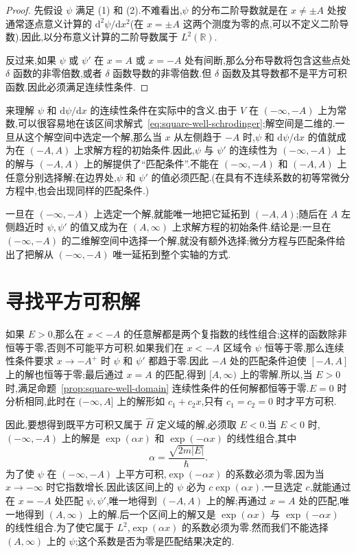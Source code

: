 \begin{proof}
先假设 \(\psi\) 满足 (1) 和 (2).不难看出,\(\psi\) 的分布二阶导数就是在 \(x\ne\pm A\) 处按通常逐点意义计算的 \(\mathrm{d}^{2}\psi/\mathrm{d}x^{2}\)(在 \(x=\pm A\) 这两个测度为零的点,可以不定义二阶导数).因此,以分布意义计算的二阶导数属于 \(L^{2}(\mathbb{R})\).

反过来,如果 \(\psi\) 或 \(\psi'\) 在 \(x=A\) 或 \(x=-A\) 处有间断,那么分布导数将包含这些点处 \(\delta\) 函数的非零倍数,或者 \(\delta\) 函数导数的非零倍数.但 \(\delta\) 函数及其导数都不是平方可积函数.因此必须满足连续性条件.
\end{proof}

来理解 \(\psi\) 和 \(\mathrm{d}\psi/\mathrm{d}x\) 的连续性条件在实际中的含义.由于 \(V\) 在 \((-\infty,-A)\) 上为常数,可以很容易地在该区间求解式~\eqref{eq:square-well-schrodinger};解空间是二维的.一旦从这个解空间中选定一个解,那么当 \(x\) 从左侧趋于 \(-A\) 时,\(\psi\) 和 \(\mathrm{d}\psi/\mathrm{d}x\) 的值就成为在 \((-A,A)\) 上求解方程的初始条件.因此,\(\psi\) 与 \(\psi'\) 的连续性为 \((-\infty,-A)\) 上的解与 \((-A,A)\) 上的解提供了“匹配条件”.不能在 \((-\infty,-A)\) 和 \((-A,A)\) 上任意分别选择解;在边界处,\(\psi\) 和 \(\psi'\) 的值必须匹配.(在具有不连续系数的初等常微分方程中,也会出现同样的匹配条件.)

一旦在 \((-\infty,-A)\) 上选定一个解,就能唯一地把它延拓到 \((-A,A)\);随后在 \(A\) 左侧趋近时 \(\psi,\psi'\) 的值又成为在 \((A,\infty)\) 上求解方程的初始条件.结论是:一旦在 \((-\infty,-A)\) 的二维解空间中选择一个解,就没有额外选择;微分方程与匹配条件给出了把解从 \((-\infty,-A)\) 唯一延拓到整个实轴的方式.

\section{寻找平方可积解}\label{sec:square-well-solutions}

如果 \(E>0\),那么在 \(x<-A\) 的任意解都是两个复指数的线性组合;这样的函数除非恒等于零,否则不可能平方可积.如果我们在 \(x<-A\) 区域令 \(\psi\) 恒等于零,那么连续性条件要求 \(x\to-A^{+}\) 时 \(\psi\) 和 \(\psi'\) 都趋于零.因此 \(-A\) 处的匹配条件迫使 \([-A,A]\) 上的解也恒等于零;最后通过 \(x=A\) 的匹配,得到 \([A,\infty)\) 上的零解.所以,当 \(E>0\) 时,满足命题~\ref{prop:square-well-domain} 连续性条件的任何解都恒等于零.\(E=0\) 时分析相同,此时在 \((-\infty,A]\) 上的解形如 \(c_{1}+c_{2}x\),只有 \(c_{1}=c_{2}=0\) 时才平方可积.

因此,要想得到既平方可积又属于 \(\widehat H\) 定义域的解,必须取 \(E<0\).当 \(E<0\) 时,\((-\infty,-A)\) 上的解是 \(\exp(\alpha x)\) 和 \(\exp(-\alpha x)\) 的线性组合,其中
\begin{equation}
\alpha=\frac{\sqrt{2m|E|}}{\hbar}.
\label{eq:square-well-alpha}
\end{equation}
为了使 \(\psi\) 在 \((-\infty,-A)\) 上平方可积,\(\exp(-\alpha x)\) 的系数必须为零,因为当 \(x\to-\infty\) 时它指数增长.因此该区间上的 \(\psi\) 必为 \(c\exp(\alpha x)\).一旦选定 \(c\),就能通过在 \(x=-A\) 处匹配 \(\psi,\psi'\),唯一地得到 \((-A,A)\) 上的解;再通过 \(x=A\) 处的匹配,唯一地得到 \((A,\infty)\) 上的解.后一个区间上的解又是 \(\exp(\alpha x)\) 与 \(\exp(-\alpha x)\) 的线性组合.为了使它属于 \(L^{2}\),\(\exp(\alpha x)\) 的系数必须为零.然而我们不能选择 \((A,\infty)\) 上的 \(\psi\);这个系数是否为零是匹配结果决定的.


